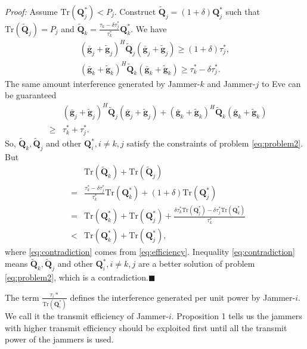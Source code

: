 \documentclass[conference]{IEEEtran}
\begin{document}
\emph{Proof:} Assume $\mathrm{Tr}(\mathbf{Q}_j^*) < P_j$. Construct $\tilde{\mathbf{Q}}_j = (1 + \delta) \mathbf{Q}_j^*$ such that $\mathrm{Tr}(\tilde{\mathbf{Q}}_j) = P_j$ and $\tilde{\mathbf{Q}}_k = \frac{\tau_k - \delta\tau_j^*}{\tau_k^*} \mathbf{Q}_k^*$. We have
\begin{eqnarray}
(\bar{\mathbf{g}}_j+\tilde{\mathbf{g}}_j)^H\tilde{\mathbf{Q}}_j(\bar{\mathbf{g}}_j+\tilde{\mathbf{g}}_j)\geq (1+ \delta)\tau_j^*,\\
(\bar{\mathbf{g}}_k+\tilde{\mathbf{g}}_k)^H\tilde{\mathbf{Q}}_k(\bar{\mathbf{g}}_k+\tilde{\mathbf{g}}_k) \geq \tau_k^* - \delta\tau_j^*.
\end{eqnarray}
The same amount interference generated by Jammer-$k$ and Jammer-$j$ to Eve can be guaranteed
\begin{eqnarray}
&&(\bar{\mathbf{g}}_j+\tilde{\mathbf{g}}_j)^H\tilde{\mathbf{Q}}_j(\bar{\mathbf{g}}_j+\tilde{\mathbf{g}}_j) \nonumber+ (\bar{\mathbf{g}}_k+\tilde{\mathbf{g}}_k)^H\tilde{\mathbf{Q}}_k(\bar{\mathbf{g}}_k+\tilde{\mathbf{g}}_k)\nonumber\\
&\geq&  \tau_k^* + \tau_j^*.
\end{eqnarray}
So, $\tilde{\mathbf{Q}}_k, \tilde{\mathbf{Q}}_j$ and other $\mathbf{Q}_i^*, i \neq k,j$ satisfy the constraints of problem \eqref{eq:problem2}. But
\begin{eqnarray}
&&\mathrm{Tr}(\tilde{\mathbf{Q}}_k) + \mathrm{Tr}(\tilde{\mathbf{Q}}_j)\\
&=&\frac{\tau_k^* - \delta\tau_j^*}{\tau_k^*} \mathrm{Tr}(\mathbf{Q}_k^*)  + (1 + \delta)\mathrm{Tr}(\mathbf{Q}_j^*)\\
&=&\mathrm{Tr}(\mathbf{Q}_k^*) + \mathrm{Tr}(\mathbf{Q}_j^*) + \frac{\delta\tau_k^*\mathrm{Tr}(\mathbf{Q}_j^*)-\delta\tau_j^*\mathrm{Tr}(\mathbf{Q}_k^*)}{\tau_k^*}\\
&<&\mathrm{Tr}(\mathbf{Q}_k^*) + \mathrm{Tr}(\mathbf{Q}_j^*), \label{eq:contradiction}
\end{eqnarray}
where \eqref{eq:contradiction} comes from  \eqref{eq:efficiency}.
Inequality \eqref{eq:contradiction} means $\tilde{\mathbf{Q}}_k, \tilde{\mathbf{Q}}_j$ and other $\mathbf{Q}_i^*, i \neq k,j$ are a better solution of problem \eqref{eq:problem2}, which is a contradiction.$\blacksquare$

The term $\frac{\tau_i*}{\mathrm{Tr}(\mathbf{Q}_i^*)}$ defines the interference generated per unit power by Jammer-$i$. We call it the transmit efficiency of Jammer-$i$. Proposition 1 tells us the jammers with higher transmit efficiency should be exploited first until all the transmit power of the jammers is used.
\end{document}
